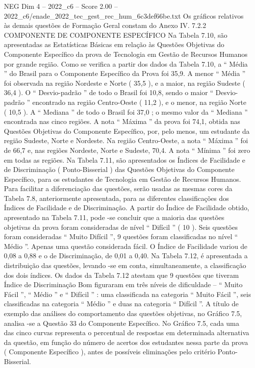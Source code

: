 \begin{textsample}{NEG Dim 4 – 2022\_c6 – Score 2.00 – 2022\_c6/enade\_2022\_tec\_gest\_rec\_hum\_6c3def66be.txt}
Os gráficos relativos às demais questões de Formação Geral constam do Anexo IV. 7.2.2 COMPONENTE DE COMPONENTE ESPECÍFICO Na Tabela 7.10, são apresentadas as Estatísticas Básicas em relação às Questões Objetivas do Componente Específico da prova de Tecnologia em Gestão de Recursos Humanos por grande região.
Como se verifica a partir dos dados da Tabela 7.10, a “ Média ” do Brasil para o Componente Específico da Prova foi 35,9.
A menor “ Média ” foi observada na região Nordeste e Norte ( 35,5 ), e a maior, na região Sudeste ( 36,4 ).
O “ Desvio-padrão ” de todo o Brasil foi 10,8, sendo o maior “ Desvio-padrão ” encontrado na região Centro-Oeste ( 11,2 ), e o menor, na região Norte ( 10,5 ).
A “ Mediana ” de todo o Brasil foi 37,0 ; o mesmo valor da “ Mediana ” encontrada nas cinco regiões.
A nota “ Máxima ” da prova foi 74,1, obtida nas Questões Objetivas do Componente Específico, por, pelo menos, um estudante da região Sudeste, Norte e Nordeste.
Na região Centro-Oeste, a nota “ Máxima ” foi de 66,7 e, nas regiões Nordeste, Norte e Sudeste, 70,4.
A nota “ Mínima ” foi zero em todas as regiões.
Na Tabela 7.11, são apresentados os Índices de Facilidade e de Discriminação ( Ponto-Bisserial ) das Questões Objetivas do Componente Específico, para os estudantes de Tecnologia em Gestão de Recursos Humanos.
Para facilitar a diferenciação das questões, serão usadas as mesmas cores da Tabela 7.8, anteriormente apresentada, para as diferentes classificações dos Índices de Facilidade e de Discriminação.
A partir do Índice de Facilidade obtido, apresentado na Tabela 7.11, pode -se concluir que a maioria das questões objetivas da prova foram consideradas de nível “ Difícil ” ( 10 ).
Seis questões foram consideradas “ Muito Difícil ”, 9 questões foram classificadas no nível “ Médio ”.
Apenas uma questão considerada fácil.
O Índice de Facilidade variou de 0,08 a 0,88 e o de Discriminação, de 0,01 a 0,40.
Na Tabela 7.12, é apresentada a distribuição das questões, levando -se em conta, simultaneamente, a classificação dos dois índices.
Os dados da Tabela 7.12 atestam que 9 questões que tiveram Índice de Discriminação Bom figuraram em três níveis de dificuldade – “ Muito Fácil ”, “ Médio ” e “ Difícil ” : uma classificada na categoria “ Muito Fácil ”, seis classificadas na categoria “ Médio ” e duas na categoria “ Difícil ”.
A título de exemplo das análises do comportamento das questões objetivas, no Gráfico 7.5, analisa -se a Questão 33 do Componente Específico.
No Gráfico 7.5, cada uma das cinco curvas representa o percentual de respostas em determinada alternativa da questão, em função do número de acertos dos estudantes nessa parte da prova ( Componente Específico ), antes de possíveis eliminações pelo critério Ponto-Bisserial.

\end{textsample}

